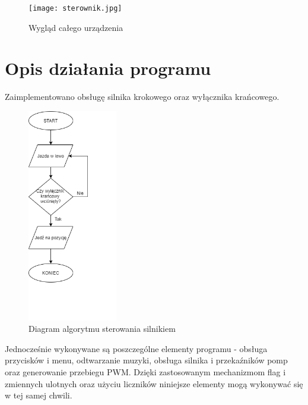 \documentclass[10pt, a4paper]{article}
\begin{document}
\begin{figure}[H]
	\centering
	\texttt{[image: sterownik.jpg]}
	\caption{Wygląd całego urządzenia}
	\label{fig:Barman}
\end{figure}
\newpage


\section{Opis działania programu}

Zaimplementowano obsługę silnika krokowego oraz wyłącznika krańcowego.

\begin{figure}[H]
	\centering
	\includegraphics[width=0.35\textwidth]{algorytm2.png}
	\caption{Diagram algorytmu sterowania silnikiem}
	\label{fig:Diagram}
\end{figure}

 
Jednocześnie wykonywane są poszczególne elementy programu - obsługa przycisków i menu, odtwarzanie muzyki, obsługa silnika i przekaźników pomp oraz generowanie przebiegu PWM. Dzięki zastosowanym mechanizmom flag i zmiennych ulotnych oraz użyciu liczników niniejsze elementy mogą wykonywać się w tej samej chwili.
 
%
%
%
%
\end{document}
